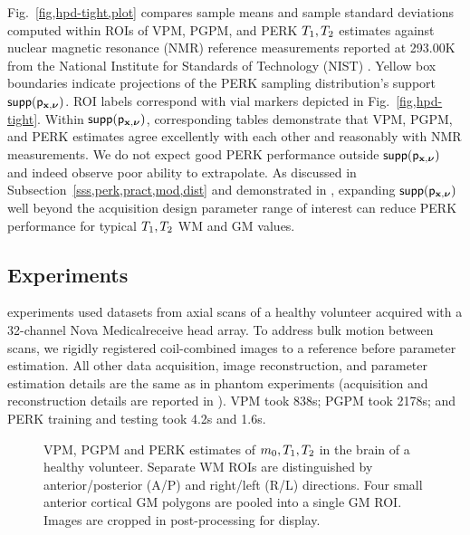 Fig.~\ref{fig,hpd-tight,plot} compares
sample means and sample standard deviations
computed within ROIs 
of VPM, PGPM, and PERK $T_1,T_2$ estimates
against nuclear magnetic resonance (NMR) reference measurements 
reported at 293.00K
from the National Institute 
for Standards of Technology (NIST) \cite{keenan:16:msm}.
Yellow box boundaries indicate projections
of the PERK sampling distribution's support $\supp{\dist{\bmx,\bmnu}}$.
ROI labels correspond with vial markers
depicted in Fig.~\ref{fig,hpd-tight}.
Within $\supp{\dist{\bmx,\bmnu}}$,
corresponding tables demonstrate
that VPM, PGPM, and PERK estimates agree excellently 
with each other 
and reasonably with NMR measurements.
We do not expect good PERK performance
outside $\supp{\dist{\bmx,\bmnu}}$ 
and indeed observe 
poor ability to extrapolate.
As discussed in Subsection~\ref{sss,perk,pract,mod,dist}
and demonstrated in ,
expanding $\supp{\dist{\bmx,\bmnu}}$
well beyond the acquisition design 
parameter range of interest
can reduce PERK performance
for typical $T_1,T_2$ WM and GM values.

\subsection{\Invivo Experiments}
\label{ss,perk,exp,invivo}

\Invivo experiments used datasets
from axial scans of a healthy volunteer
acquired with a 32-channel Nova Medical\regis receive head array.
To address bulk motion between scans,
we rigidly registered coil-combined images 
to a reference
before parameter estimation.
All other data acquisition, 
image reconstruction, 
and parameter estimation details
are the same as in phantom experiments
(acquisition and reconstruction details 
are reported in \cite{nataraj:17:oms}).
VPM took 838s;
PGPM took 2178s;
and PERK training and testing
took 4.2s and 1.6s.

\begin{figure*}[!ht]
	\centering
	\begin{minipage}{\textwidth}
  	\hspace{0cm}
  	\hspace{0cm}
	\end{minipage}
	\caption{%
		VPM, PGPM and PERK estimates
		of $m_0,T_1,T_2$ 
		in the brain of a healthy volunteer.
		Separate WM ROIs are distinguished
		by anterior/posterior (A/P)
		and right/left (R/L) directions.
		Four small anterior cortical GM polygons
		are pooled into a single GM ROI.
		Images are cropped in post-processing 
		for display.
	}
	\label{fig,brain}
\end{figure*}

